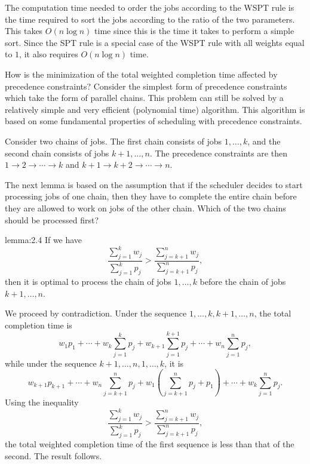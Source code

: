 The computation time needed to order the jobs according to the WSPT rule 
is the time required to sort the jobs according to the ratio of the 
two parameters. This takes $O(n\log n)$ time since this is the time it takes
to perform a simple sort. Since the SPT rule is a special case of the WSPT 
rule with all weights equal to $1$, it also requires $O(n\log n)$ time. 

How is the minimization of the total weighted completion time affected by
precedence constraints?  Consider the simplest form of precedence constraints
which take the form of parallel chains. This problem can still be solved by a 
relatively simple and very efficient (polynomial time) algorithm. This 
algorithm is based on some fundamental properties of scheduling with 
precedence constraints.

Consider two chains of jobs. The first chain consists of jobs $1, \dots, k$, 
and the second chain consists of jobs $k+1, \dots, n$. The precedence 
constraints are then $1 \to 2 \to \cdots \to k$ and $k+1 \to k+2 \to 
\cdots \to n$. 

The next lemma is based on the assumption that if the scheduler decides to
start processing jobs of one chain, then they have to complete the entire 
chain before they are allowed to work on jobs of the other chain.
Which of the two chains should be processed first? 

\begin{lemma}{lemma:2.4}
    If we have 
    \[ \frac{\sum_{j=1}^k w_j}{\sum_{j=1}^k p_j} > 
    \frac{\sum_{j=k+1}^n w_j}{\sum_{j=k+1}^n p_j}, \] 
    then it is optimal to process the chain of jobs $1, \dots, k$ before 
    the chain of jobs $k+1, \dots, n$. 
\end{lemma}
\begin{pf}
    We proceed by contradiction. Under the sequence $1, \dots, k, k+1, 
    \dots, n$, the total completion time is 
    \[ w_1p_1 + \cdots + w_k \sum_{j=1}^k p_j + w_{k+1} \sum_{j=1}^{k+1} 
    p_j + \cdots + w_n \sum_{j=1}^n p_j, \] 
    while under the sequence $k+1, \dots, n, 1, \dots, k$, it is 
    \[ w_{k+1}p_{k+1} + \cdots + w_n \sum_{j=k+1}^n p_j + w_1 
    \left( \sum_{j=k+1}^n p_j + p_1 \right) + \cdots + w_k \sum_{j=1}^n p_j. \] 
    Using the inequality 
    \[ \frac{\sum_{j=1}^k w_j}{\sum_{j=1}^k p_j} > 
    \frac{\sum_{j=k+1}^n w_j}{\sum_{j=k+1}^n p_j}, \] 
    the total weighted completion time of the first sequence 
    is less than that of the second. The result follows. 
\end{pf}

